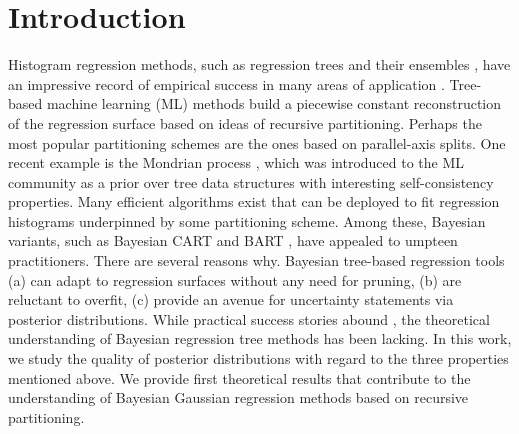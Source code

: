 \documentclass{article}
\newcommand{\1}{\mathbb{I}}
\theoremstyle{assumption}
\begin{document}
\section{Introduction}
Histogram regression methods, such as regression trees \cite{cart} and their ensembles \cite{breiman}, have an impressive record of empirical success in many areas of application \cite{Berchuck2005, Nimeh2007, Razi2005, Green2012, Polley2010}. Tree-based machine learning (ML) methods build a piecewise constant reconstruction of  the regression surface based  on  ideas of recursive partitioning. Perhaps the most popular partitioning schemes are the ones based on parallel-axis splits. One recent example is the Mondrian process \cite{mondrian}, which was introduced to the ML community as a prior over tree data structures with interesting self-consistency properties. Many efficient algorithms exist that can be deployed to fit regression histograms underpinned by some partitioning scheme. Among these, Bayesian variants, such as Bayesian CART  \cite{Chipman1998,Denison1998} and BART \cite{Chipman2010}, have appealed to umpteen practitioners. There are several reasons why. Bayesian tree-based regression tools (a) can adapt to regression surfaces without any need for pruning, (b) are reluctant to  overfit, (c) provide an avenue for  uncertainty statements via posterior distributions. 
While practical success stories abound  \cite{Berchuck2005, Nimeh2007, Razi2005, Green2012, Polley2010}, the theoretical understanding of Bayesian  regression tree methods has  been lacking. In this work, we study the quality of posterior distributions with regard to the three properties mentioned above.
We provide first theoretical results that contribute to the understanding of Bayesian Gaussian regression methods based on recursive partitioning.
\end{document}
